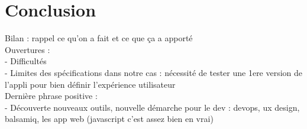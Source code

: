 	\section*{Conclusion}
		Bilan : rappel ce qu'on a fait et ce que ça a apporté\\
		Ouvertures :\\
			- Difficultés\\
			- Limites des spécifications dans notre cas : nécessité de tester une 1ere version de l'appli pour bien définir l'expérience utilisateur\\
		Dernière phrase positive :\\
			- Découverte nouveaux outils, nouvelle démarche pour le dev : devops, ux design, balsamiq, les app web (javascript c'est assez bien en vrai)
		

